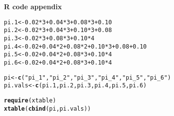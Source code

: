 \documentclass[12pt]{article}\usepackage[]{graphicx}\usepackage[]{color}
\makeatletter
\newcommand{\hlnum}[1]{\textcolor[rgb]{0.686,0.059,0.569}{#1}}%
\newcommand{\hlstr}[1]{\textcolor[rgb]{0.192,0.494,0.8}{#1}}%
\newcommand{\hlopt}[1]{\textcolor[rgb]{0,0,0}{#1}}%
\newcommand{\hlstd}[1]{\textcolor[rgb]{0.345,0.345,0.345}{#1}}%
\newcommand{\hlkwb}[1]{\textcolor[rgb]{0.69,0.353,0.396}{#1}}%
\newcommand{\hlkwd}[1]{\textcolor[rgb]{0.737,0.353,0.396}{\textbf{#1}}}%
\newenvironment{kframe}{%
 \def\at@end@of@kframe{}%
 \ifinner\ifhmode%
  \def\at@end@of@kframe{\end{minipage}}%
  \begin{minipage}{\columnwidth}%
 \fi\fi%
 \def\FrameCommand##1{\hskip\@totalleftmargin \hskip-\fboxsep
 \colorbox{shadecolor}{##1}\hskip-\fboxsep
     \hskip-\linewidth \hskip-\@totalleftmargin \hskip\columnwidth}%
 \MakeFramed {\advance\hsize-\width
   \@totalleftmargin\z@ \linewidth\hsize
   \@setminipage}}%
 {\par\unskip\endMakeFramed%
 \at@end@of@kframe}
\newenvironment{knitrout}{}{} %
\makeatother
\begin{document}
\newpage

{\Large \bf R code appendix}

\begin{knitrout}\footnotesize
{}\color{fgcolor}\begin{kframe}
\begin{alltt}
\hlstd{pi.1} \hlkwb{<-} \hlnum{0.02}\hlopt{*}\hlnum{3}\hlopt{+}\hlnum{0.04}\hlopt{*}\hlnum{3}\hlopt{+}\hlnum{0.08}\hlopt{*}\hlnum{3}\hlopt{+}\hlnum{0.10}
\hlstd{pi.2} \hlkwb{<-} \hlnum{0.02}\hlopt{*}\hlnum{3} \hlopt{+} \hlnum{0.04}\hlopt{*}\hlnum{3} \hlopt{+} \hlnum{0.10}\hlopt{*}\hlnum{3} \hlopt{+} \hlnum{0.08}
\hlstd{pi.3} \hlkwb{<-} \hlnum{0.02}\hlopt{*}\hlnum{3} \hlopt{+} \hlnum{0.08}\hlopt{*}\hlnum{3} \hlopt{+} \hlnum{0.10}\hlopt{*}\hlnum{4}
\hlstd{pi.4} \hlkwb{<-} \hlnum{0.02} \hlopt{+} \hlnum{0.04}\hlopt{*}\hlnum{2} \hlopt{+} \hlnum{0.08}\hlopt{*}\hlnum{2} \hlopt{+} \hlnum{0.10}\hlopt{*}\hlnum{3} \hlopt{+} \hlnum{0.08} \hlopt{+} \hlnum{0.10}
\hlstd{pi.5} \hlkwb{<-} \hlnum{0.02} \hlopt{+} \hlnum{0.04}\hlopt{*}\hlnum{2} \hlopt{+} \hlnum{0.08}\hlopt{*}\hlnum{3} \hlopt{+} \hlnum{0.10}\hlopt{*}\hlnum{4}
\hlstd{pi.6} \hlkwb{<-} \hlnum{0.02} \hlopt{+} \hlnum{0.04}\hlopt{*}\hlnum{2}\hlopt{+} \hlnum{0.08}\hlopt{*}\hlnum{3} \hlopt{+} \hlnum{0.10}\hlopt{*}\hlnum{4}

\hlstd{pi} \hlkwb{<-} \hlkwd{c}\hlstd{(}\hlstr{"pi_1"}\hlstd{,} \hlstr{"pi_2"}\hlstd{,} \hlstr{"pi_3"}\hlstd{,} \hlstr{"pi_4"}\hlstd{,} \hlstr{"pi_5"}\hlstd{,} \hlstr{"pi_6"}\hlstd{)}
\hlstd{pi.vals} \hlkwb{<-} \hlkwd{c}\hlstd{(pi.1, pi.2, pi.3, pi.4, pi.5, pi.6)}

\hlkwd{require}\hlstd{(xtable)}
\hlkwd{xtable}\hlstd{(}\hlkwd{cbind}\hlstd{(pi, pi.vals))}
\end{alltt}
\end{kframe}
\end{knitrout}
\end{document}
